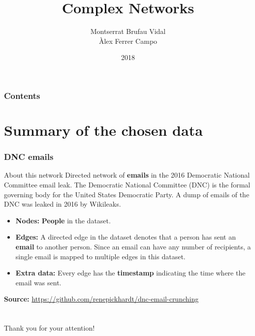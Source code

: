 \documentclass{beamer}
\title[]{Complex Networks}
\author[]{Montserrat Brufau Vidal\\ Àlex Ferrer Campo}
\institute[]{Universitat de Barcelona}
\date{2018}
\theoremstyle{plain}
\theoremstyle{definition}
\theoremstyle{remark}
\begin{document}
\begin{frame}
\titlepage
\end{frame}

\begin{frame}
\frametitle{Contents}
\tableofcontents
\end{frame}


\section{Summary of the chosen data}


\begin{frame}
\frametitle{DNC emails}
\begin{block}{About this network}
	Directed network of \textbf{emails} in the 2016 Democratic National Committee email leak. The Democratic National Committee (DNC) is the formal governing body for the United States Democratic Party. A dump of emails of the DNC was leaked in 2016 by Wikileaks. 
\end{block}
\pause
\begin{itemize}
	\item \textbf{Nodes:} \textbf{People} in the dataset.
	\pause
	\item \textbf{Edges:} A directed edge in the dataset denotes that a person has sent an \textbf{email} to another person. Since an email can have any number of recipients, a single email is mapped to multiple edges in this dataset.
	\pause
	\item \textbf{Extra data:} Every edge has the \textbf{timestamp} indicating the time where the email was sent.
\end{itemize}
\textbf{Source:} \href{https://github.com/renepickhardt/dnc-email-crunching}{https://github.com/renepickhardt/dnc-email-crunching}

\end{frame}



\section*{}
\begin{frame}

\centering
\Huge{Thank you for your attention!}

\end{frame}

\end{document}
